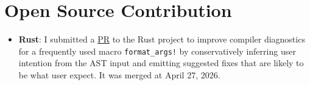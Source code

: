 \documentclass[letterpaper,11pt]{article}
\makeatletter
\newcommand{\resumeItem}[1]{
  \item\small{
    {#1 \vspace{-2pt}}
  }
}
\newcommand{\resumeSubheading}[4]{
  \vspace{-2pt}\item
    \begin{tabular*}{0.97\textwidth}[t]{l@{\extracolsep{\fill}}r}
      \textbf{#1} & #2 \\
      \textit{\small#3} & \textit{\small #4} \\
    \end{tabular*}\vspace{-7pt}
}
\newcommand{\resumeSubSubheading}[2]{
    \item
    \begin{tabular*}{0.97\textwidth}{l@{\extracolsep{\fill}}r}
      \textit{\small#1} & \textit{\small #2} \\
    \end{tabular*}\vspace{-7pt}
}
\newcommand{\resumeSubHeadingListEnd}{\end{itemize}}
\newcommand{\resumeItemListStart}{\begin{itemize}}
\newcommand{\resumeItemListEnd}{\end{itemize}\vspace{-5pt}}
\makeatother
\begin{document}




\section{Open Source Contribution}
\begin{itemize}[leftmargin=0.15in, label={}]
	\item \textbf{Rust}: I submitted a
	      \href{https://github.com/rust-lang/rust/pull/155693}{\underline{PR}} to the Rust project to
	      improve compiler diagnostics for a frequently used macro \texttt{format\_args!} by
	      conservatively inferring user intention from the AST input and emitting suggested fixes that
	      are likely to be what user expect. It was merged at April 27, 2026.
\end{itemize}
\end{document}
